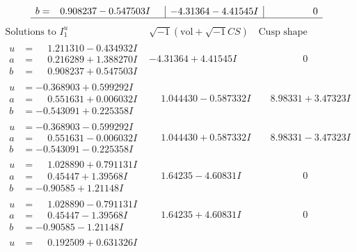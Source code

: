 \documentclass[1p]{elsarticle_modified}
\theoremstyle{definition}
\newcommand{\I}{\sqrt{-1}}
\begin{document}
$$\begin{array}{c|c|c}
\begin{aligned}
b &= \phantom{-}0.908237 - 0.547503 I\end{aligned}
 & -4.31364 - 4.41545 I & \phantom{-0.000000 } 0\\
 \hline 
 \end{array}$$\newpage$$\begin{array}{c|c|c}  
\text{Solutions to }I^u_{1}& \I (\text{vol} + \sqrt{-1}CS) & \text{Cusp shape}\\
 \hline 
\begin{aligned}
u &= \phantom{-}1.211310 - 0.434932 I \\
a &= \phantom{-}0.216289 + 1.388270 I \\
b &= \phantom{-}0.908237 + 0.547503 I\end{aligned}
 & -4.31364 + 4.41545 I & \phantom{-0.000000 } 0 \\ \hline\begin{aligned}
u &= -0.368903 + 0.599292 I \\
a &= \phantom{-}0.551631 + 0.006032 I \\
b &= -0.543091 + 0.225358 I\end{aligned}
 & \phantom{-}1.044430 - 0.587332 I & \phantom{-}8.98331 + 3.47323 I \\ \hline\begin{aligned}
u &= -0.368903 - 0.599292 I \\
a &= \phantom{-}0.551631 - 0.006032 I \\
b &= -0.543091 - 0.225358 I\end{aligned}
 & \phantom{-}1.044430 + 0.587332 I & \phantom{-}8.98331 - 3.47323 I \\ \hline\begin{aligned}
u &= \phantom{-}1.028890 + 0.791131 I \\
a &= \phantom{-}0.45447 + 1.39568 I \\
b &= -0.90585 + 1.21148 I\end{aligned}
 & \phantom{-}1.64235 - 4.60831 I & \phantom{-0.000000 } 0 \\ \hline\begin{aligned}
u &= \phantom{-}1.028890 - 0.791131 I \\
a &= \phantom{-}0.45447 - 1.39568 I \\
b &= -0.90585 - 1.21148 I\end{aligned}
 & \phantom{-}1.64235 + 4.60831 I & \phantom{-0.000000 } 0 \\ \hline\begin{aligned}
u &= \phantom{-}0.192509 + 0.631326 I \\

\end{aligned}
\end{array}$$
\end{document}
